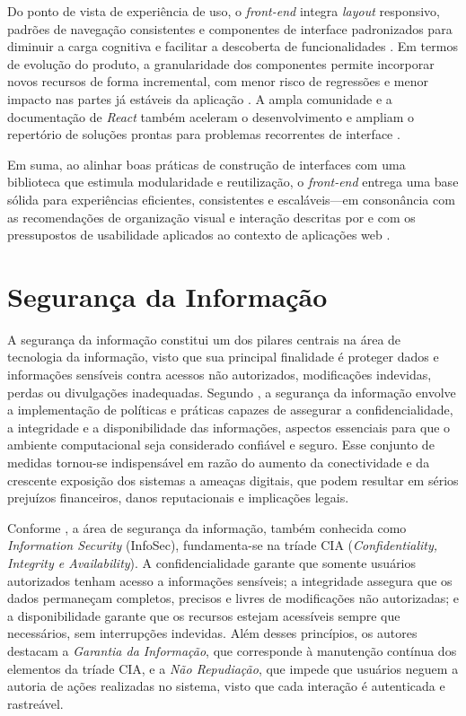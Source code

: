 Do ponto de vista de experiência de uso, o \textit{front-end} integra \textit{layout} responsivo,
padrões de navegação consistentes e componentes de interface padronizados para diminuir a
carga cognitiva e facilitar a descoberta de funcionalidades \parencite{TOTVS2021}. Em
termos de evolução do produto, a granularidade dos componentes permite incorporar
novos recursos de forma incremental, com menor risco de regressões e menor impacto nas
partes já estáveis da aplicação \parencite{ReactLegacyPTBR2024}. A ampla comunidade e a
documentação de \textit{React} também aceleram o desenvolvimento e ampliam o repertório
de soluções prontas para problemas recorrentes de interface \parencite{ReactLegacyPTBR2024}.

Em suma, ao alinhar boas práticas de construção de interfaces com uma biblioteca que
estimula modularidade e reutilização, o \textit{front-end} entrega uma base sólida para
experiências eficientes, consistentes e escaláveis---em consonância com as recomendações
de organização visual e interação descritas por \textcite{Meloni2018HTMLCSSJS4e} e com os
pressupostos de usabilidade aplicados ao contexto de aplicações web
\parencite{TOTVS2021,ReactLegacyPTBR2024}.

\section{Segurança da Informação}

A segurança da informação constitui um dos pilares centrais na área de tecnologia da informação, visto que sua principal finalidade é proteger dados e informações sensíveis contra acessos não autorizados, modificações indevidas, perdas ou divulgações inadequadas. Segundo \textcite{Fontes2008}, a segurança da informação envolve a implementação de políticas e práticas capazes de assegurar a confidencialidade, a integridade e a disponibilidade das informações, aspectos essenciais para que o ambiente computacional seja considerado confiável e seguro. Esse conjunto de medidas tornou-se indispensável em razão do aumento da conectividade e da crescente exposição dos sistemas a ameaças digitais, que podem resultar em sérios prejuízos financeiros, danos reputacionais e implicações legais.

Conforme \textcite{HoldsworthKosinski2024}, a área de segurança da informação, também conhecida como \textit{Information Security} (InfoSec), fundamenta-se na tríade CIA (\textit{Confidentiality, Integrity e Availability}). A confidencialidade garante que somente usuários autorizados tenham acesso a informações sensíveis; a integridade assegura que os dados permaneçam completos, precisos e livres de modificações não autorizadas; e a disponibilidade garante que os recursos estejam acessíveis sempre que necessários, sem interrupções indevidas. Além desses princípios, os autores destacam a \textit{Garantia da Informação}, que corresponde à manutenção contínua dos elementos da tríade CIA, e a \textit{Não Repudiação}, que impede que usuários neguem a autoria de ações realizadas no sistema, visto que cada interação é autenticada e rastreável.

